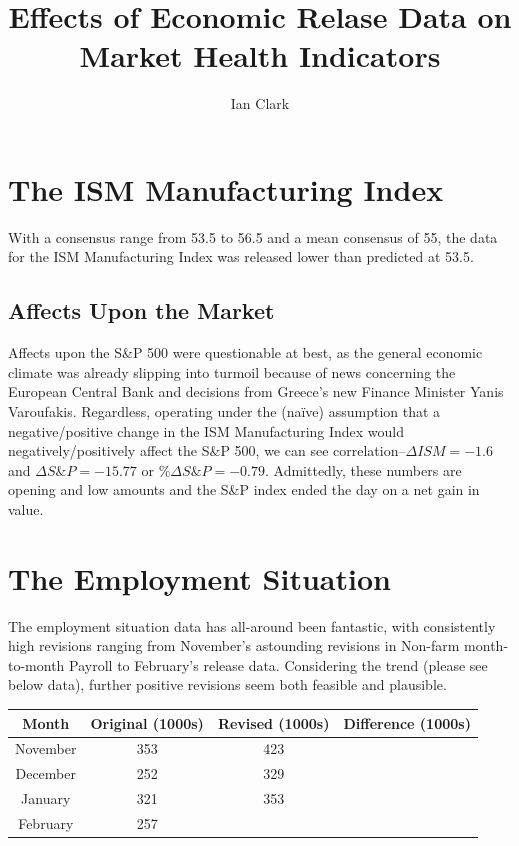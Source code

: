 \documentclass[11pt,letterpaper,english]{article}
\title{Effects of Economic Relase Data on Market Health Indicators}
\author{Ian Clark}
\date{}
\begin{document}
\maketitle

\section{The ISM Manufacturing Index}
With a consensus range from 53.5 to 56.5 and a mean consensus of 55, the data for the ISM Manufacturing Index was released lower than predicted at 53.5. 

\subsection{Affects Upon the Market}
Affects upon the S\&P 500 were questionable at best, as the general economic climate was already slipping into turmoil because of news concerning the European Central Bank and decisions from Greece's new Finance Minister Yanis Varoufakis. Regardless, operating under the (naïve) assumption that a negative/positive change in the ISM Manufacturing Index would negatively/positively affect the S\&P 500, we can see correlation--$\Delta{ISM} = -1.6$ and $\Delta{S\&P} = -15.77$ or $\%\Delta{S\&P} = -0.79$. Admittedly, these numbers are opening and low amounts and the S\&P index ended the day on a net gain in value.

\section{The Employment Situation}
The employment situation data has all-around been fantastic, with consistently high revisions ranging from November's astounding revisions in Non-farm month-to-month Payroll to February's release data. Considering the trend (please see below data), further positive revisions seem both feasible and plausible.

\begin{center}
    \begin{tabular}{| c | c | c | c |}
    \hline
    Month       & Original (1000s) & Revised (1000s) & Difference (1000s) \\ \hline
    November    & 353 & 423 & \cellcolor{green}{+70} \\ \hline
    December    & 252 & 329 & \cellcolor{green}{+77} \\ \hline
    January     & 321 & 353 & \cellcolor{green}{+32} \\ \hline
    February    & 257 & \cellcolor{black}{} & \cellcolor{black}{} \\ \hline
    \end{tabular}
\end{center}
\end{document}
